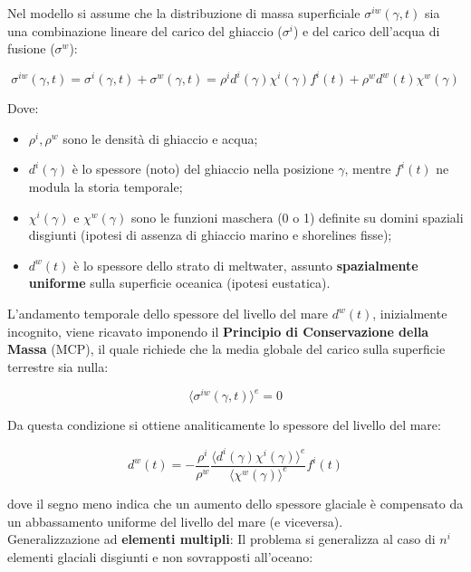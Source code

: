 \documentclass[a4paper,12pt]{book}
\begin{document}
\noindent
Nel modello si assume che la distribuzione di massa superficiale $\sigma^{iw}(\gamma,t)$ sia una combinazione lineare del carico del ghiaccio ($\sigma^i$) e del carico dell'acqua di fusione ($\sigma^w$):

\begin{equation}
    \sigma^{iw}(\gamma,t) = \sigma^i (\gamma,t) + \sigma^w (\gamma,t) = \rho^i d^i(\gamma) \chi^i(\gamma) f^i(t) + \rho^w d^w(t) \chi^w(\gamma)
\end{equation}

\noindent
Dove:
\begin{itemize}
    \item $\rho^i, \rho^w$ sono le densità di ghiaccio e acqua;
    \item $d^i(\gamma)$ è lo spessore (noto) del ghiaccio nella posizione $\gamma$, mentre $f^i(t)$ ne modula la storia temporale;
    \item $\chi^i(\gamma)$ e $\chi^w(\gamma)$ sono le funzioni maschera (0 o 1) definite su domini spaziali disgiunti (ipotesi di assenza di ghiaccio marino e shorelines fisse);
    \item $d^w(t)$ è lo spessore dello strato di meltwater, assunto \textbf{spazialmente uniforme} sulla superficie oceanica (ipotesi eustatica).
\end{itemize}

\noindent
L'andamento temporale dello spessore del livello del mare $d^w(t)$, inizialmente incognito, viene ricavato imponendo il \textbf{Principio di Conservazione della Massa} (MCP), il quale richiede che la media globale del carico sulla superficie terrestre sia nulla:

\begin{equation}
    \langle \sigma^{iw}(\gamma,t) \rangle^e = 0
\end{equation}

\noindent
Da questa condizione si ottiene analiticamente lo spessore del livello del mare:

\begin{equation}
    d^w(t) = -\frac{\rho^i}{\rho^w} \frac{\langle d^i(\gamma)\chi^i(\gamma) \rangle^e}{\langle \chi^w(\gamma) \rangle^e} f^i(t)
\end{equation}

\noindent
dove il segno meno indica che un aumento dello spessore glaciale è compensato da un abbassamento uniforme del livello del mare (e viceversa).\\

\noindent
Generalizzazione ad \textbf{elementi multipli}:
Il problema si generalizza  al caso di $n^i$ elementi glaciali disgiunti e non sovrapposti all'oceano:
\end{document}
